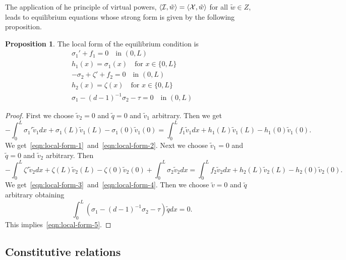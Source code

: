\documentclass[a4paper,10pt,twoside]{amsbook}
\numberwithin{section}{chapter}
\numberwithin{equation}{chapter}
\theoremstyle{definition}
\newtheorem{prop}{Proposition}[chapter]
\DeclarePairedDelimiter{\dual}{\langle}{\rangle}
\begin{document}
The application of he principle of virtual powers, $\dual{\mathcal{I},\tilde w}=\dual{\mathcal{X},\tilde w}$ for all $\tilde w\in Z$, leads to equilibrium equations whose strong form is given by the following proposition.
\begin{prop}
The local form of the equilibrium condition is
\begin{subequations}
\begin{gather}
\sigma_1'+f_1=0\quad\text{in $(0,L)$} \label{eqn:local-form-1}\\
h_1(x)=\sigma_1(x)\quad\text{for $x\in\{0,L\}$} \label{eqn:local-form-2}\\
-\sigma_2+\zeta'+f_2=0\quad\text{in $(0,L)$} \label{eqn:local-form-3}\\
h_2(x)=\zeta(x)\quad\text{for $x\in\{0,L\}$} \label{eqn:local-form-4}\\
\sigma_1-(d-1)^{-1}\sigma_2-\tau=0\quad\text{in $(0,L)$} \label{eqn:local-form-5}
\end{gather}
\end{subequations}
\end{prop}
\begin{proof}
First we choose $\tilde v_2=0$ and $\tilde q=0$ and $\tilde v_1$ arbitrary. Then we get
\[
-\int_0^L\sigma_1'\tilde v_1dx+\sigma_1(L)\tilde v_1(L)-\sigma_1(0)\tilde v_1(0)=\int_0^Lf_1\tilde v_1dx+h_1(L)\tilde v_1(L)-h_1(0)\tilde v_1(0).
\]
We get~\eqref{eqn:local-form-1}~and~\eqref{eqn:local-form-2}. Next we choose $\tilde v_1=0$ and $\tilde q=0$ and $\tilde v_2$ arbitrary. Then
\[
-\int_0^L\zeta'\tilde v_2dx+\zeta(L)\tilde v_2(L)-\zeta(0)\tilde v_2(0)+\int_0^L\sigma_2\tilde v_2dx=\int_0^Lf_2\tilde v_2dx+h_2(L)\tilde v_2(L)-h_2(0)\tilde v_2(0).
\]
We get~\eqref{eqn:local-form-3}~and~\eqref{eqn:local-form-4}. Then we choose $\tilde v=0$ and $\tilde q$ arbitrary obtaining
\[
\int_0^L(\sigma_1-(d-1)^{-1}\sigma_2-\tau)\tilde qdx=0.
\]
This implies~\eqref{eqn:local-form-5}.
\end{proof}

\subsection{Constitutive relations}
\end{document}
